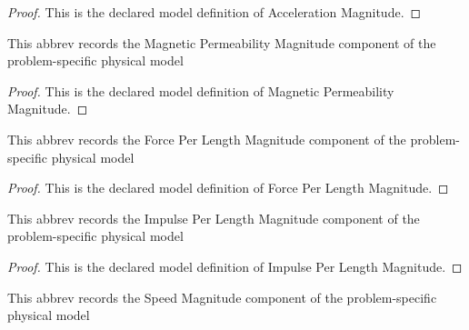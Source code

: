 \begin{proof}
  This is the declared model definition of Acceleration Magnitude.
\end{proof}
\begin{definition}
  \label{def:physics:phyx-mini-0971:phyxminiproblems-problemphyxmini0971-magneticpermeabilitymagnitude}
  This abbrev records the Magnetic Permeability Magnitude component of the problem-specific physical model
\end{definition}
\begin{proof}
  This is the declared model definition of Magnetic Permeability Magnitude.
\end{proof}
\begin{definition}
  \label{def:physics:phyx-mini-0971:phyxminiproblems-problemphyxmini0971-forceperlengthmagnitude}
  This abbrev records the Force Per Length Magnitude component of the problem-specific physical model
\end{definition}
\begin{proof}
  This is the declared model definition of Force Per Length Magnitude.
\end{proof}
\begin{definition}
  \label{def:physics:phyx-mini-0971:phyxminiproblems-problemphyxmini0971-impulseperlengthmagnitude}
  This abbrev records the Impulse Per Length Magnitude component of the problem-specific physical model
\end{definition}
\begin{proof}
  This is the declared model definition of Impulse Per Length Magnitude.
\end{proof}
\begin{definition}
  \label{def:physics:phyx-mini-0971:phyxminiproblems-problemphyxmini0971-speedmagnitude}
  This abbrev records the Speed Magnitude component of the problem-specific physical model
\end{definition}
